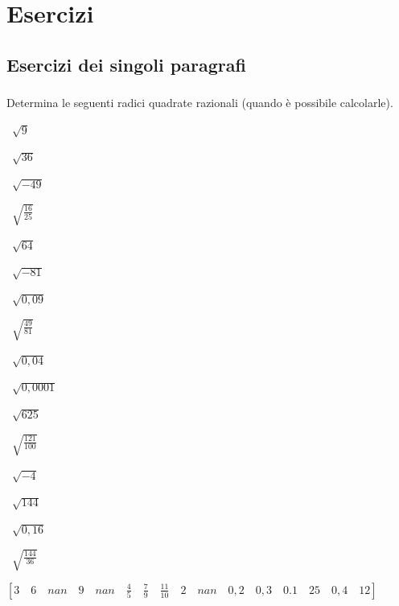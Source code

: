 
\section{Esercizi}

\subsection{Esercizi dei singoli paragrafi}
\subsubsection*{}


\begin{esercizio}
 \label{ese:2.01}
Determina le seguenti radici quadrate razionali (quando è possibile calcolarle).
\begin{multicols}{4}
 \begin{enumeratea}
 \item~$\sqrt 9$
 \item~$\sqrt{36}$
 \item~$\sqrt{-49}$
 \item~$\sqrt{\frac{16}{25}}$
 \item~$\sqrt{64}$
 \item~$\sqrt{-81}$
 \item~$\sqrt{0,09}$
 \item~$\sqrt{\frac{49}{81}}$
 \item~$\sqrt{0,04}$
 \item~$\sqrt{0,0001}$
 \item~$\sqrt{625}$
 \item~$\sqrt{\frac{121}{100}}$
 \item~$\sqrt{-4}$
 \item~$\sqrt{144}$
 \item~$\sqrt{0,16}$
 \item~$\sqrt{\frac{144}{36}}$
 \end{enumeratea}
 \end{multicols}
\begin{flushright}
\vspace*{-8pt}
 $[3 \quad 6 \quad nan \quad 9 \quad nan \quad 
 \frac{4}{5} \quad \frac{7}{9} \quad \frac{11}{10} \quad 2 \quad 
 nan \quad 0,2 \quad 0,3 \quad 0.1 \quad 25 \quad 0,4 \quad 12]$
\end{flushright}
\end{esercizio}

